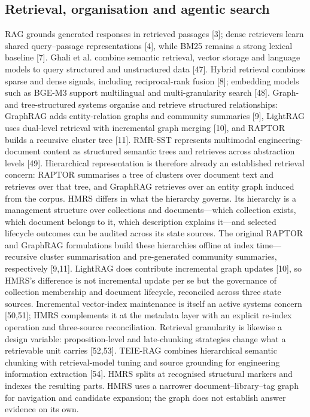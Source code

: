 \documentclass[11pt]{article}
\begin{document}
\subsection{Retrieval, organisation and agentic search}
RAG grounds generated responses in retrieved passages [3]; dense
retrievers learn shared query--passage representations [4], while BM25
remains a strong lexical baseline [7]. Ghali et al. combine
semantic retrieval, vector storage and language models to query structured and
unstructured data [47]. Hybrid retrieval combines
sparse and dense signals, including reciprocal-rank fusion
[8]; embedding models such as BGE-M3 support multilingual and
multi-granularity search [48]. Graph- and tree-structured systems
organise and retrieve structured relationships: GraphRAG adds entity-relation
graphs and community summaries [9], LightRAG uses dual-level
retrieval with incremental graph merging [10], and RAPTOR builds a
recursive cluster tree [11]. RMR-SST represents multimodal
engineering-document content as structured semantic trees and retrieves
across abstraction levels [49]. Hierarchical
representation is therefore already an established retrieval concern: RAPTOR summarises a tree of clusters over
document text and retrieves over that tree, and GraphRAG retrieves over an
entity graph induced from the corpus. HMRS differs in what the hierarchy
governs. Its hierarchy is a management structure over collections and
documents---which collection exists, which document belongs to it, which
description explains it---and selected lifecycle outcomes can be audited
across its state sources. The original RAPTOR and GraphRAG formulations build these hierarchies
offline at index time---recursive cluster summarisation and pre-generated
community summaries, respectively [9,11]. LightRAG
does contribute incremental graph updates [10], so HMRS's
difference is not incremental update per se but the governance of collection
membership and document lifecycle, reconciled across three state sources.
Incremental vector-index maintenance is itself an
active systems concern [50,51]; HMRS
complements it at the metadata layer with an explicit re-index operation and
three-source reconciliation. Retrieval granularity is likewise a design
variable: proposition-level and late-chunking strategies change what a
retrievable unit carries [52,53]. TEIE-RAG
combines hierarchical semantic chunking with retrieval-model tuning and source
grounding for engineering information extraction [54].
HMRS splits at recognised structural markers and indexes the resulting parts.
HMRS uses a
narrower document--library--tag graph for navigation and candidate
expansion; the graph does not establish answer evidence on its own.
\end{document}
